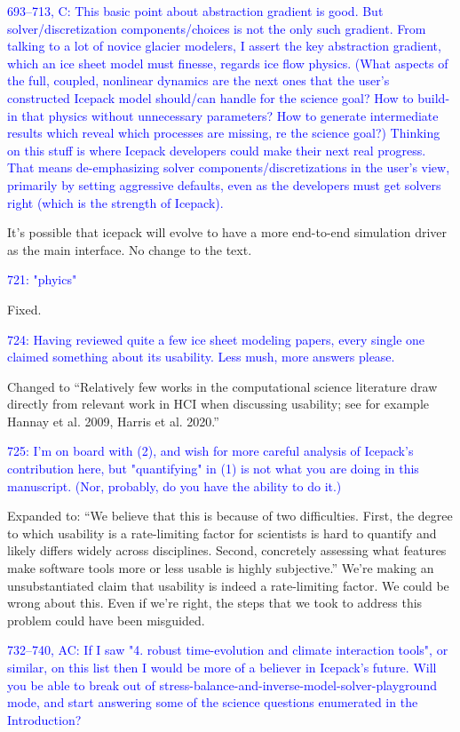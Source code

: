 \documentclass{article}
\theoremstyle{definition}
\theoremstyle{plain}
\begin{document}
\textcolor{blue}{693--713, C:  This basic point about abstraction gradient is good.  But solver/discretization components/choices is not the only such gradient.  From talking to a lot of novice glacier modelers, I assert the key abstraction gradient, which an ice sheet model must finesse, regards ice flow physics.  (What aspects of the full, coupled, nonlinear dynamics are the next ones that the user's constructed Icepack model should/can handle for the science goal?  How to build-in that physics without unnecessary parameters?  How to generate intermediate results which reveal which processes are missing, re the science goal?)  Thinking on this stuff is where Icepack developers could make their next real progress.  That means de-emphasizing solver components/discretizations in the user's view, primarily by setting aggressive defaults, even as the developers must get solvers right (which is the strength of Icepack).}

It's possible that icepack will evolve to have a more end-to-end simulation driver as the main interface.
No change to the text.

\textcolor{blue}{721:  "phyics"}

Fixed.

\textcolor{blue}{724:  Having reviewed quite a few ice sheet modeling papers, every single one claimed something about its usability.  Less mush, more answers please.}

Changed to ``Relatively few works in the computational science literature draw directly from relevant work in HCI when discussing usability; see for example Hannay et al. 2009, Harris et al. 2020.''

\textcolor{blue}{725:  I'm on board with (2), and wish for more careful analysis of Icepack's contribution here, but "quantifying" in (1) is not what you are doing in this manuscript.  (Nor, probably, do you have the ability to do it.)}

Expanded to: ``We believe that this is because of two difficulties.
First, the degree to which usability is a rate-limiting factor for scientists is hard to quantify and likely differs widely across disciplines.
Second, concretely assessing what features make software tools more or less usable is highly subjective.''
We're making an unsubstantiated claim that usability is indeed a rate-limiting factor.
We could be wrong about this.
Even if we're right, the steps that we took to address this problem could have been misguided.

\textcolor{blue}{732--740, AC:  If I saw "4. robust time-evolution and climate interaction tools", or similar, on this list then I would be more of a believer in Icepack's future.  Will you be able to break out of stress-balance-and-inverse-model-solver-playground mode, and start answering some of the science questions enumerated in the Introduction?}
\end{document}

